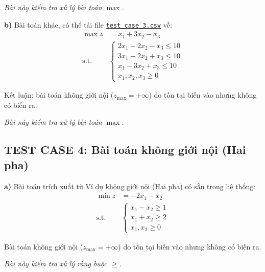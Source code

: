 \documentclass[12pt,a4paper]{article}
\begin{document}
\textit{Bài này kiểm tra xử lý bài toán $\max$.}

\noindent \textbf{b)} Bài toán khác, có thể tải file \href{https://drive.google.com/uc?export=download&id=1bhEezs8vDbxG-h9YroT_dE6cqpEMrtwA}{\texttt{test\_case\_3.csv}} về:
\begin{equation*}
    \begin{aligned}
        \max z &= x_1 + 3x_2 - x_3 \\
        \text{s.t.} \quad
        &\begin{cases}
            2x_1 + 2x_2 - x_3 \leq 10 \\
            3x_1 - 2x_2 + x_3 \leq 10 \\
             x_1 - 3x_2 + x_3 \leq 10 \\
            x_1, x_2, x_3 \geq 0
        \end{cases}
    \end{aligned}
\end{equation*}

Kết luận: bài toán không giới nội ($z_{\max} = +\infty$) do tồn tại biến vào nhưng không có biến ra.

\textit{Bài này kiểm tra xử lý bài toán $\max$.}

\subsection*{TEST CASE 4: Bài toán không giới nội (Hai pha)}

\noindent \textbf{a)} Bài toán trích xuất từ \colorbox{green!30}{Ví dụ không giới nội (Hai pha)} có sẵn trong hệ thống:
\begin{equation*}
    \begin{aligned}
        \min z &= -2x_1 - x_2 \\
        \text{s.t.} \quad
        &\begin{cases}
            x_1 - x_2 \geq 1 \\
            x_1 + x_2 \geq 2 \\
            x_1, x_2 \geq 0
        \end{cases}
    \end{aligned}
\end{equation*}

Bài toán không giới nội ($z_{\max} = +\infty$) do tồn tại biến vào nhưng không có biến ra.

\textit{Bài này kiểm tra xử lý ràng buộc $\geq$.}
\end{document}
